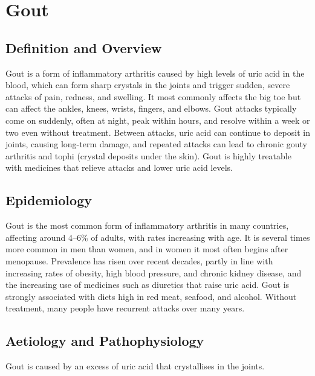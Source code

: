 \chapter{Gout}

\section*{Definition and Overview}
Gout is a form of inflammatory arthritis caused by high levels of uric acid in the blood, which can form sharp crystals in the joints and trigger sudden, severe attacks of pain, redness, and swelling. It most commonly affects the big toe but can affect the ankles, knees, wrists, fingers, and elbows. Gout attacks typically come on suddenly, often at night, peak within hours, and resolve within a week or two even without treatment. Between attacks, uric acid can continue to deposit in joints, causing long-term damage, and repeated attacks can lead to chronic gouty arthritis and tophi (crystal deposits under the skin). Gout is highly treatable with medicines that relieve attacks and lower uric acid levels.

\section*{Epidemiology}
Gout is the most common form of inflammatory arthritis in many countries, affecting around 4--6\% of adults, with rates increasing with age. It is several times more common in men than women, and in women it most often begins after menopause. Prevalence has risen over recent decades, partly in line with increasing rates of obesity, high blood pressure, and chronic kidney disease, and the increasing use of medicines such as diuretics that raise uric acid. Gout is strongly associated with diets high in red meat, seafood, and alcohol. Without treatment, many people have recurrent attacks over many years.

\section*{Aetiology and Pathophysiology}
Gout is caused by an excess of uric acid that crystallises in the joints.

